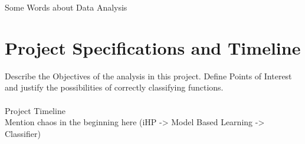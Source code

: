 \documentclass[main.tex]{subfiles}
\begin{document}
  
  Some Words about Data Analysis
  
  \section{Project Specifications and Timeline}
    Describe the Objectives of the analysis in this project. Define Points of Interest and justify the possibilities of correctly classifying functions.
    \\\\
    Project Timeline \\
    Mention chaos in the beginning here (iHP -> Model Based Learning -> Classifier)
\end{document}
